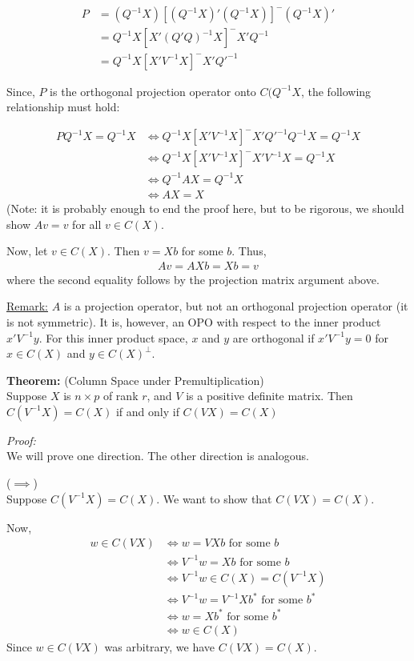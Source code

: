 \documentclass[12pt]{article}
\numberwithin{equation}{section}
\begin{document}
\begin{align*}
  P &= (Q^{-1}X) [(Q^{-1}X)' (Q^{-1}X)]^{-} (Q^{-1} X)' \\
    &= Q^{-1} X [X'(Q'Q)^{-1} X]^{-} X'Q^{-1} \\
    &= Q^{-1} X [X'V^{-1}X]^{-} X'Q'^{-1}
\end{align*}

Since, $P$ is the orthogonal projection operator onto $C(Q^{-1} X$, the following relationship must hold:

\begin{align*}
  PQ^{-1}X = Q^{-1} X 
    &\iff Q^{-1} X [X'V^{-1}X]^{-} X'Q'^{-1} Q^{-1} X = Q^{-1} X \\
    &\iff Q^{-1} X [X'V^{-1}X]^{-} X'V^{-1} X = Q^{-1} X \\
    & \iff Q^{-1} A X = Q^{-1} X \\
    &\iff AX = X
\end{align*}
(Note: it is probably enough to end the proof here, but to be rigorous, we should show $Av = v$ for all $v \in C(X)$.

Now, let $v \in C(X)$. Then $v = Xb$ for some $b$. Thus,
\begin{align*}
  Av = AXb = Xb = v
\end{align*}
where the second equality follows by the projection matrix argument above.

\underline{Remark:} $A$ is a projection operator, but not an orthogonal projection operator (it is not symmetric). It is, however, an OPO with respect to the inner product $x'V^{-1}y$. For this inner product space, $x$ and $y$ are orthogonal if $x'V^{-1}y = 0$ for $x \in C(X)$ and $y \in C(X)^{\perp}$.

\textbf{Theorem:} (Column Space under Premultiplication)\\
Suppose $X$ is $n \times p$ of rank $r$, and $V$ is a positive definite matrix. Then $C(V^{-1} X) = C(X)$ if and only if $C(VX) = C(X)$

\textit{Proof:} \\
We will prove one direction. The other direction is analogous.

($\implies$) \\
Suppose $C(V^{-1} X) = C(X)$. We want to show that $C(VX) = C(X)$.

Now,
%
\begin{align*}
  w \in C(VX)  & \iff w = VXb \text{ for some } b \\
    &\iff V^{-1}w = Xb \text{ for some } b \\
    &\iff V^{-1}w \in C(X) = C(V^{-1} X) \\
    &\iff V^{-1}w = V^{-1}Xb^* \text{ for some } b^* \\
    &\iff w = Xb^* \text{ for some } b^* \\
    &\iff w \in C(X)
\end{align*}
%
Since $w \in C(VX)$ was arbitrary, we have $C(VX) = C(X)$.
\end{document}

